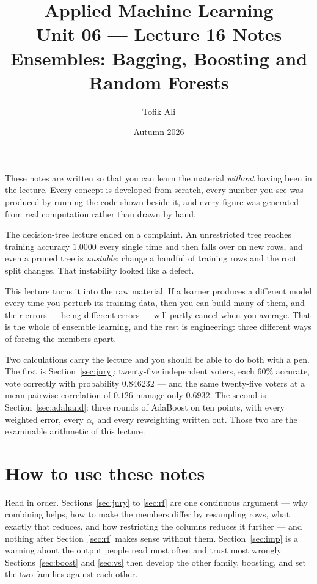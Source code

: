 \documentclass[11pt]{article}
\title{Applied Machine Learning\\Unit 06 --- Lecture 16 Notes\\
       Ensembles: Bagging, Boosting and Random Forests}
\author{Tofik Ali}
\date{Autumn 2026}
\begin{document}
\maketitle

\begin{keyidea}
These notes are written so that you can learn the material \emph{without}
having been in the lecture. Every concept is developed from scratch, every
number you see was produced by running the code shown beside it, and every
figure was generated from real computation rather than drawn by hand.

The decision-tree lecture ended on a complaint. An unrestricted tree reaches
training accuracy $1.0000$ every single time and then falls over on new rows,
and even a pruned tree is \emph{unstable}: change a handful of training rows
and the root split changes. That instability looked like a defect.

This lecture turns it into the raw material. If a learner produces a
different model every time you perturb its training data, then you can build
many of them, and their errors --- being different errors --- will partly
cancel when you average. That is the whole of ensemble learning, and the rest
is engineering: three different ways of forcing the members apart.

Two calculations carry the lecture and you should be able to do both with a
pen. The first is Section~\ref{sec:jury}: twenty-five independent voters, each
$60\%$ accurate, vote correctly with probability $\mathbf{0.846232}$ --- and
the same twenty-five voters at a mean pairwise correlation of $0.126$ manage
only $0.6932$. The second is Section~\ref{sec:adahand}: three rounds of
AdaBoost on ten points, with every weighted error, every $\alpha_t$ and every
reweighting written out. Those two are the examinable arithmetic of this
lecture.
\end{keyidea}

\tableofcontents
\medskip

\section{How to use these notes}
\label{sec:how}

Read in order. Sections~\ref{sec:jury} to \ref{sec:rf} are one continuous
argument --- why combining helps, how to make the members differ by resampling
rows, what exactly that reduces, and how restricting the columns reduces it
further --- and nothing after Section~\ref{sec:rf} makes sense without them.
Section~\ref{sec:imp} is a warning about the output people read most often and
trust most wrongly. Sections~\ref{sec:boost} and \ref{sec:vs} then develop the
other family, boosting, and set the two families against each other.
\end{document}
